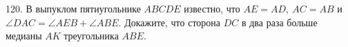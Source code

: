 120. В выпуклом пятиугольнике $ABCDE$ известно, что $AE=AD,\ AC=AB$ и $\angle DAC=\angle AEB+\angle ABE.$ Докажите, что сторона $DC$ в два раза больше медианы $AK$ треугольника $ABE.$\\
